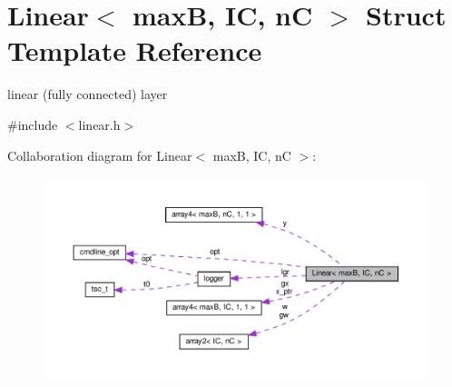 \hypertarget{structLinear}{}\section{Linear$<$ maxB, IC, nC $>$ Struct Template Reference}
\label{structLinear}


linear (fully connected) layer  




{\ttfamily \#include $<$linear.\+h$>$}



Collaboration diagram for Linear$<$ maxB, IC, nC $>$\+:
\nopagebreak
\begin{figure}[H]
\begin{center}
\leavevmode
\includegraphics[width=350pt]{structLinear__coll__graph}
\end{center}
\end{figure}
